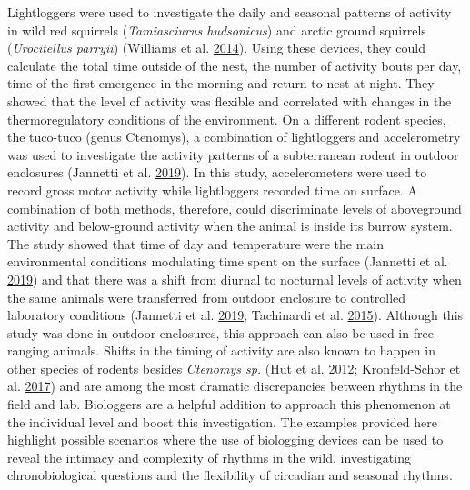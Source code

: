 \documentclass[msc,numbers,hidelinks]{coppe}
\begin{document}
  Lightloggers were used to investigate the daily and seasonal patterns of activity in wild red squirrels (\emph{Tamiasciurus hudsonicus}) and arctic ground squirrels (\emph{Urocitellus parryii}) (Williams et al. \protect\hyperlink{ref-williamsLightLoggersReveal2014}{2014}). Using these devices, they could calculate the total time outside of the nest, the number of activity bouts per day, time of the first emergence in the morning and return to nest at night. They showed that the level of activity was flexible and correlated with changes in the thermoregulatory conditions of the environment. On a different rodent species, the tuco-tuco (genus Ctenomys), a combination of lightloggers and accelerometry was used to investigate the activity patterns of a subterranean rodent in outdoor enclosures (Jannetti et al. \protect\hyperlink{ref-jannettiDayNightSubterranean2019}{2019}). In this study, accelerometers were used to record gross motor activity while lightloggers recorded time on surface. A combination of both methods, therefore, could discriminate levels of aboveground activity and below-ground activity when the animal is inside its burrow system. The study showed that time of day and temperature were the main environmental conditions modulating time spent on the surface (Jannetti et al. \protect\hyperlink{ref-jannettiDayNightSubterranean2019}{2019}) and that there was a shift from diurnal to nocturnal levels of activity when the same animals were transferred from outdoor enclosure to controlled laboratory conditions (Jannetti et al. \protect\hyperlink{ref-jannettiDayNightSubterranean2019}{2019}; Tachinardi et al. \protect\hyperlink{ref-tachinardiNocturnalDiurnalSwitches2015}{2015}). Although this study was done in outdoor enclosures, this approach can also be used in free-ranging animals. Shifts in the timing of activity are also known to happen in other species of rodents besides \emph{Ctenomys sp.} (Hut et al. \protect\hyperlink{ref-hutSearchTemporalNiche2012}{2012}; Kronfeld-Schor et al. \protect\hyperlink{ref-kronfeld-schorChronobiologyInterspecificInteractions2017}{2017}) and are among the most dramatic discrepancies between rhythms in the field and lab. Biologgers are a helpful addition to approach this phenomenon at the individual level and boost this investigation. The examples provided here highlight possible scenarios where the use of biologging devices can be used to reveal the intimacy and complexity of rhythms in the wild, investigating chronobiological questions and the flexibility of circadian and seasonal rhythms.
\end{document}
